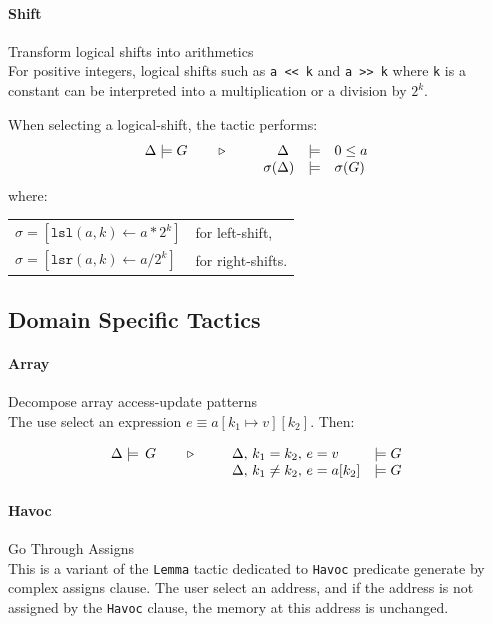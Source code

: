 \paragraph{Shift} Transform logical shifts into arithmetics\\
For positive integers, logical shifts such as \lstinline{a << k}
and \lstinline{a >> k} where \lstinline$k$ is a constant can be interpreted into a multiplication or a division by $2^k$.

When selecting a logical-shift, the tactic performs:
\[\TACTIC{\Delta\models G}{%
\begin{array}[t]{rcl}
\Delta\phantom{)} &\models& 0 \leq a \\
\sigma(\Delta) &\models& \sigma(G)
\end{array}
}\]
where:
\begin{tabular}[t]{ll}
$\sigma = [ \mathtt{lsl}(a,k) \leftarrow a * 2^k ]$ &
for left-shift, \\
$\sigma = [ \mathtt{lsr}(a,k) \leftarrow a / 2^k ]$ &
for right-shifts.
\end{tabular}

\subsection{Domain Specific Tactics}

\paragraph{Array} Decompose array access-update patterns\\
The use select an expression $e\equiv a[k_1\mapsto v][k_2]$. Then:

\[
\TACTIC{\Delta\models\,G}{%
\begin{array}[t]{ll}
\Delta,\,k_1=k_2,\,e = v &\models G \\
\Delta,\,k_1\neq k_2,\,e = a[k_2] &\models G
\end{array}
}\]

\paragraph{Havoc} Go Through Assigns \\
This is a variant of the \texttt{Lemma} tactic dedicated to \texttt{Havoc}
predicate generate by complex assigns clause. The user select an address, and
if the address is not assigned by the \texttt{Havoc} clause, the memory at this
address is unchanged.

